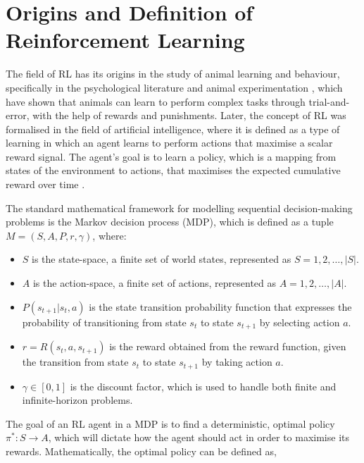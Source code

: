 \documentclass[a4paper,singleside,12pt]{report} %
\begin{document}
\section{Origins and Definition of Reinforcement Learning}\label{origins}

The field of RL has its origins in the study of animal learning and behaviour, specifically in the psychological literature \cite{Rao2000ReinforcementLA} and animal experimentation \cite{Rescorla1988behavioral}, which have shown that animals can learn to perform complex tasks through trial-and-error, with the help of rewards and punishments. Later, the concept of RL was formalised in the field of artificial intelligence, where it is defined as a type of learning in which an agent learns to perform actions that maximise a scalar reward signal. The agent's goal is to learn a policy, which is a mapping from states of the environment to actions, that maximises the expected cumulative reward over time \cite{Rao2000ReinforcementLA}.

The standard mathematical framework for modelling sequential decision-making problems is the Markov decision process (MDP), which is defined as a tuple \(M = (S, A, P, r, \gamma)\), where:

\begin{itemize}
\item
  \(S\) is the state-space, a finite set of world states, represented as \(S = {1, 2, \dots, |S|}\).
\item
  \(A\) is the action-space, a finite set of actions, represented as \(A = {1, 2, \dots, |A|}\).
\item
  \(P(s_{t+1}|s_t, a)\) is the state transition probability function that expresses the probability of transitioning from state \(s_t\) to state \(s_{t+1}\) by selecting action \(a\).
\item
  \(r = R(s_t, a, s_{t+1})\) is the reward obtained from the reward function, given the transition from state \(s_t\) to state \(s_{t+1}\) by taking action
  \(a\).
\item
  \(\gamma \in [0, 1]\) is the discount factor, which is used to handle both finite and infinite-horizon problems.
\end{itemize}

The goal of an RL agent in a MDP is to find a deterministic, optimal policy \(\pi^*: S \rightarrow A\), which will dictate how the agent should act in order to maximise its rewards. Mathematically, the optimal policy can be defined as,
\end{document}

